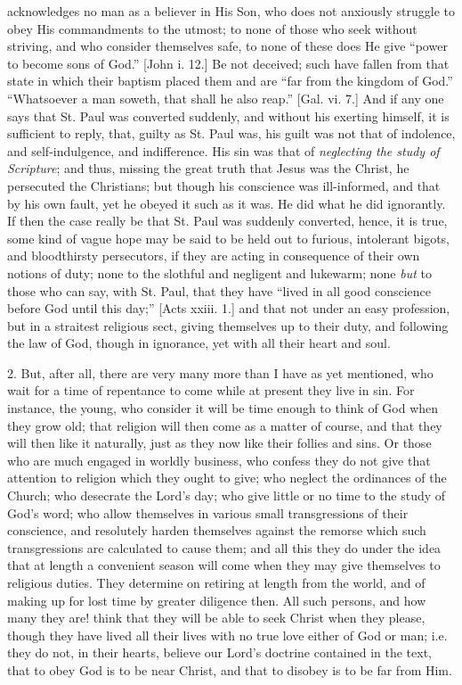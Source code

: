 acknowledges no man as a believer in His Son, who does not anxiously
struggle to obey His commandments to the utmost; to none of those who
seek without striving, and who consider themselves safe, to none of
these does He give ``power to become sons of God.'' [John i.
12.] Be not deceived; such have fallen from that state in which their
baptism placed them and are ``far from the kingdom of God.''
``Whatsoever a man soweth, that shall he also reap.'' [Gal.
vi. 7.] And if any one says that St. Paul was converted suddenly, and
without his exerting himself, it is sufficient to reply, that, guilty
as St. Paul was, his guilt was not that of indolence, and
self-indulgence, and indifference. His sin was that of \emph{neglecting
the study of Scripture}; and thus, missing the great truth that
Jesus was the Christ, he persecuted the Christians; but though his
conscience was ill-informed, and that by his own fault, yet he obeyed
it such as it was. He did what he did ignorantly. If then the case
really be that St. Paul was suddenly converted, hence, it is true,
some kind of vague hope may be said to be held out to furious,
intolerant bigots, and bloodthirsty persecutors, if they are acting in
consequence of their own notions of duty; none to the slothful and
negligent and lukewarm; none \emph{but} to those who can say, with St.
Paul, that they have ``lived in all good conscience before God
until this day;'' [Acts xxiii. 1.] and that not under an easy
profession, but in a straitest religious sect, giving themselves up to
their duty, and following the law of God, though in ignorance, yet
with all their heart and soul.

2. But, after all, there are very many more than I have as yet
mentioned, who wait for a time of repentance to come while at present
they live in sin. For instance, the young, who consider it will be
time enough to think of God when they grow old; that religion will
then come as a matter of course, and that they will then like it
naturally, just as they now like their follies and sins. Or those who
are much engaged in worldly business, who confess they do not give
that attention to religion which they ought to give; who neglect the
ordinances of the Church; who desecrate the Lord's day; who give
little or no time to the study of God's word; who allow themselves in
various small transgressions of their conscience, and resolutely
harden themselves against the remorse which such transgressions are
calculated to cause them; and all this they do under the idea that at
length a convenient season will come when they may give themselves to
religious duties. They determine on retiring at length from the world,
and of making up for lost time by greater diligence then. All such
persons, and how many they are! think that they will be able to seek
Christ when they please, though they have lived all their lives with
no true love either of God or man; i.e. they do not, in their hearts,
believe our Lord's doctrine contained in the text, that to obey God is
to be near Christ, and that to disobey is to be far from Him.

